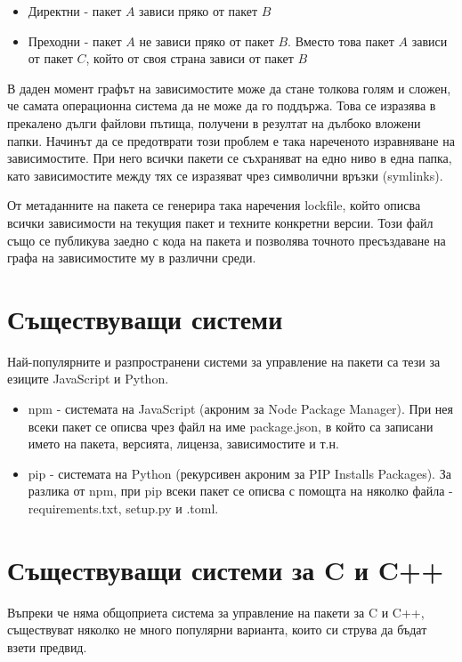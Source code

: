 \begin{itemize}
    \item Директни - пакет \(A\) зависи пряко от пакет \(B\)
    \item Преходни - пакет \(A\) не зависи пряко от пакет \(B\). Вместо това
          пакет \(A\) зависи от пакет \(C\), който от своя страна зависи от
          пакет \(B\)
\end{itemize}

В даден момент графът на зависимостите може да стане толкова голям и сложен, че
самата операционна система да не може да го поддържа. Това се изразява в
прекалено дълги файлови пътища, получени в резултат на дълбоко вложени папки.
Начинът да се предотврати този проблем е така нареченото изравняване на
зависимостите. При него всички пакети се съхраняват на едно ниво в една папка,
като зависимостите между тях се изразяват чрез символични връзки (symlinks).

От метаданните на пакета се генерира така наречения lockfile, който описва
всички зависимости на текущия пакет и техните конкретни версии. Този файл също
се публикува заедно с кода на пакета и позволява точното пресъздаване на графа
на зависимостите му в различни среди.


\section{Съществуващи системи}

Най-популярните и разпространени системи за управление на пакети са тези за
езиците JavaScript и Python.

\begin{itemize}
    \item npm - системата на JavaScript (акроним за Node Package Manager). При
          нея всеки пакет се описва чрез файл на име package.json, в който са
          записани името на пакета, версията, лиценза, зависимостите и т.н.
    \item pip - системата на Python (рекурсивен акроним за PIP Installs
          Packages). За разлика от npm, при pip всеки пакет се описва с помощта
          на няколко файла - requirements.txt, setup.py и .toml.
\end{itemize}


\section{Съществуващи системи за C и C++}

Въпреки че няма общоприета система за управление на пакети за C и C++,
съществуват няколко не много популярни варианта, които си струва да бъдат взети
предвид.

